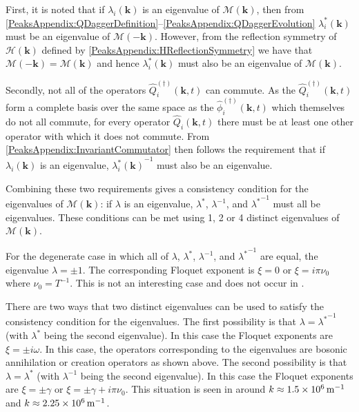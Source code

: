 First, it is noted that if $\lambda_i(\bm{k})$ is an eigenvalue of $\mathcal{M}(\bm{k})$, then from \eqref{PeaksAppendix:QDaggerDefinition}--\eqref{PeaksAppendix:QDaggerEvolution} $\lambda_i^*(\bm{k})$ must be an eigenvalue of $\mathcal{M}(-\bm{k})$. However, from the reflection symmetry of $\mathcal{H}(\bm{k})$ defined by \eqref{PeaksAppendix:HReflectionSymmetry} we have that $\mathcal{M}(-\bm{k}) = \mathcal{M}(\bm{k})$ and hence $\lambda_i^*(\bm{k})$ must also be an eigenvalue of $\mathcal{M}(\bm{k})$.

Secondly, not all of the operators $\hat{Q}_i^{(\dagger)}(\bm{k}, t)$ can commute. As the $\hat{Q}_i^{(\dagger)}(\bm{k}, t)$ form a complete basis over the same space as the $\hat{\phi}_i^{(\dagger)}(\bm{k}, t)$ which themselves do not all commute, for every operator $\hat{Q}_i(\bm{k}, t)$ there must be at least one other operator with which it does not commute. From \eqref{PeaksAppendix:InvariantCommutator} then follows the requirement that if $\lambda_i(\bm{k})$ is an eigenvalue,   ${\lambda_i^*(\bm{k})}^{-1}$ must also be an eigenvalue.

Combining these two requirements gives a consistency condition for the eigenvalues of $\mathcal{M}(\bm{k})$: if $\lambda$ is an eigenvalue, $\lambda^*$, $\lambda^{-1}$, and ${\lambda^*}^{-1}$ must all be eigenvalues. These conditions can be met using 1, 2 or 4 distinct eigenvalues of $\mathcal{M}(\bm{k})$.

For the degenerate case in which all of $\lambda$, $\lambda^*$, $\lambda^{-1}$, and ${\lambda^*}^{-1}$ are equal, the eigenvalue $\lambda = \pm 1$. The corresponding Floquet exponent is $\xi = 0$ or $\xi = i \pi\nu_0$ where $\displaystyle \nu_0 = T^{-1}$. This is not an interesting case and does not occur in .

There are two ways that two distinct eigenvalues can be used to satisfy the consistency condition for the eigenvalues. The first possibility is that $\lambda = {\lambda^*}^{-1}$ (with $\lambda^*$ being the second eigenvalue). In this case the Floquet exponents are $\xi = \pm i \omega$. In this case, the operators corresponding to the eigenvalues are bosonic annihilation or creation operators as shown above. The second possibility is that $\lambda = \lambda^*$ (with $\lambda^{-1}$ being the second eigenvalue). In this case the Floquet exponents are $\xi = \pm \gamma$ or $\xi = \pm \gamma + i \pi \nu_0$. This situation is seen in  around $k \approx \unit[1.5 \times 10^6]{m}^{-1}$ and $k \approx \unit[2.25 \times 10^6]{m}^{-1}$.

